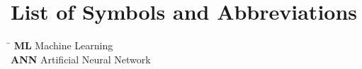 \documentclass[11pt, a4paper, twoside]{article}
\begin{document}


\printbibliography[heading=bibintoc, title={Bibliography}]

\section*{List of Symbols and Abbreviations}
\begin{tabbing}
    \hspace{4cm} \= \kill
    \textbf{ML} \> Machine Learning \\
    \textbf{ANN} \> Artificial Neural Network
\end{tabbing}
\end{document}
